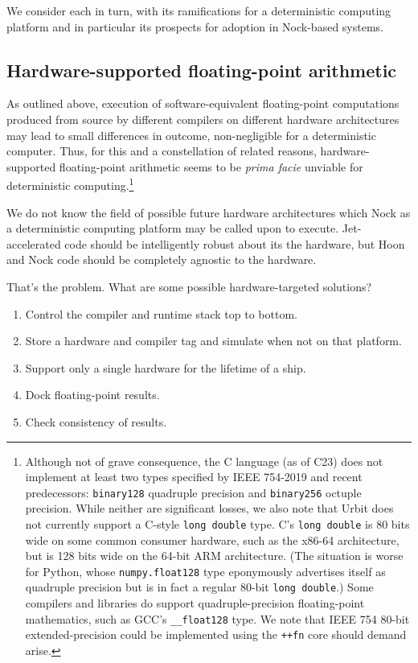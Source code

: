 \documentclass[twoside]{article}
\begin{document}
We consider each in turn, with its ramifications for a deterministic computing platform and in particular its prospects for adoption in Nock-based systems.

\subsection{Hardware-supported floating-point arithmetic}

As outlined above, execution of software-equivalent floating-point computations produced from source by different compilers on different hardware architectures may lead to small differences in outcome, non-negligible for a deterministic computer.  Thus, for this and a constellation of related reasons, hardware-supported floating-point arithmetic seems to be \emph{prima facie} unviable for deterministic computing.\footnote{Although not of grave consequence, the C language (as of C23) does not implement at least two types specified by IEEE 754-2019 and recent predecessors:  \texttt{binary128} quadruple precision and \texttt{binary256} octuple precision.  While neither are significant losses, we also note that Urbit does not currently support a C-style \texttt{long double} type.  C's \texttt{long double} is 80 bits wide on some common consumer hardware, such as the x86-64 architecture, but is 128 bits wide on the 64-bit ARM architecture.  (The situation is worse for Python, whose \texttt{numpy.float128} type eponymously advertises itself as quadruple precision but is in fact a regular 80-bit \texttt{long double}.)  Some compilers and libraries do support quadruple-precision floating-point mathematics, such as GCC's \texttt{\_\_float128} type.  We note that IEEE 754 80-bit extended-precision could be implemented using the \texttt{++fn} core should demand arise.}

We do not know the field of possible future hardware architectures which Nock as a deterministic computing platform may be called upon to execute.  Jet-accelerated code should be intelligently robust about its the hardware, but Hoon and Nock code should be completely agnostic to the hardware.

That's the problem.  What are some possible hardware-targeted solutions?

\begin{enumerate}
  \item  Control the compiler and runtime stack top to bottom.
  \item  Store a hardware and compiler tag and simulate when not on that platform.
  \item  Support only a single hardware for the lifetime of a ship.
  \item  Dock floating-point results.
  \item  Check consistency of results.
\end{enumerate}
\end{document}
